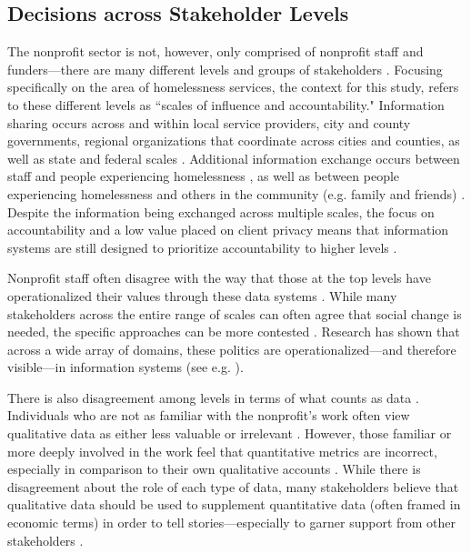 \subsection{Decisions across Stakeholder Levels}

The nonprofit sector is not, however, only comprised of nonprofit staff and funders---there are many different levels and groups of stakeholders \citep{Bryson1995Strategic}. Focusing specifically on the area of homelessness services, the context for this study, \citet{LeDantec2010Boundaries} refers to these different levels as ``scales of influence and accountability." Information sharing occurs across and within local service providers, city and county governments, regional organizations that coordinate across cities and counties, as well as state and federal scales \citep{LeDantec2010Boundaries,Benjamin2018Policy}. Additional information exchange occurs between staff and people experiencing homelessness \citep{LeDantec2011Publics}, as well as between people experiencing homelessness and others in the community (e.g. family and friends) \citep{LeDantec2008Dignity}. Despite the information being exchanged across multiple scales, the focus on accountability and a low value placed on client privacy means that information systems are still designed to prioritize accountability to higher levels \citep{LeDantec2010Boundaries,Sparks2010Broke}.

Nonprofit staff often disagree with the way that those at the top levels have operationalized their values through these data systems \citep{Voida2014SharedValues,Voida2017Currencies}. While many stakeholders across the entire range of scales can often agree that social change is needed, the specific approaches can be more contested \citep{Voida2014SharedValues}. Research has shown that across a wide array of domains, these politics are operationalized---and therefore visible---in information systems (see e.g. \citet{Bowker2000Sorting,Bowker2000Bio,Pine2015Politics,Voida2014SharedValues,Voida2017Currencies}).

There is also disagreement among levels in terms of what counts as data \citep{Rodger2016Mobility,Verma2016DrillDown,Voida2017Currencies}. Individuals who are not as familiar with the nonprofit's work often view qualitative data as either less valuable or irrelevant \citep{Thomas2016Outcome}. However, those familiar or more deeply involved in the work feel that quantitative metrics are incorrect, especially in comparison to their own qualitative accounts \citep{Schwalbe2004HS}. While there is disagreement about the role of each type of data, many stakeholders believe that qualitative data should be used to supplement quantitative data (often framed in economic terms) in order to tell stories---especially to garner support from other stakeholders \citep{Erete2016Storytelling,Rodger2016Mobility}.

